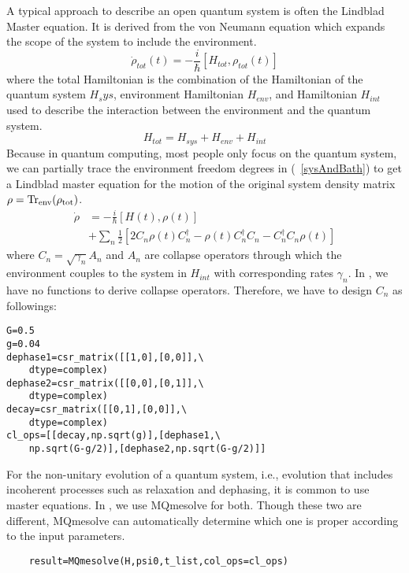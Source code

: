 A typical approach to describe an open quantum system is often the Lindblad Master equation. It is derived from the von Neumann equation which expands the scope of the system to include the environment.
\begin{equation}
    \dot{\rho}_{tot}(t)=-\frac{i}{\hbar}\left[H_{tot},\rho_{tot}(t)\right]
    \label{sysAndBath}
\end{equation}
where the total Hamiltonian is the combination of the Hamiltonian of the quantum system $H_sys$, environment Hamiltonian $H_{env}$, and Hamiltonian $H_{int}$ used to describe the interaction between the environment and the quantum system.
\begin{equation}
    H_{tot}=H_{sys}+H_{env}+H_{int}
\end{equation}
Because in quantum computing, most people only focus on the quantum system, we can partially trace the environment freedom degrees in (~\ref{sysAndBath}) to get a Lindblad master equation for the motion of the original system density matrix $\rho=\rm{Tr}_{env}(\rho_{tot})$.
\begin{equation}
\begin{split}
\dot{\rho}&=-\frac{i}{\hbar}\left[H(t),\rho(t)\right]\\
&+\sum_{n}\frac{1}{2}\left[2C_{n}\rho(t)C^{\dagger}_{n}-\rho(t)C_{n}^{\dagger}C_{n}-C_{n}^{\dagger}C_{n}\rho(t)\right]
\end{split}
\end{equation}
where $C_{n}=\sqrt{\gamma_{n}}A_{n}$ and $A_n$ are collapse operators through which the environment couples to the system in $H_{int}$ with corresponding rates $\gamma_{n}$. In \MindQuantum, we have no functions to derive collapse operators. Therefore, we have to design $C_{n}$ as followings:
\begin{lstlisting}
G=0.5
g=0.04
dephase1=csr_matrix([[1,0],[0,0]],\
    dtype=complex)
dephase2=csr_matrix([[0,0],[0,1]],\
    dtype=complex)
decay=csr_matrix([[0,1],[0,0]],\
    dtype=complex)
cl_ops=[[decay,np.sqrt(g)],[dephase1,\
    np.sqrt(G-g/2)],[dephase2,np.sqrt(G-g/2)]]
\end{lstlisting}
For the non-unitary evolution of a quantum system, i.e., evolution that includes incoherent processes such as relaxation and dephasing, it is common to use master equations. In \MindQuantum, we use MQmesolve for both. Though these two are different, MQmesolve can automatically determine which one is proper according to the input parameters.
\begin{lstlisting}
    result=MQmesolve(H,psi0,t_list,col_ops=cl_ops)
\end{lstlisting}

